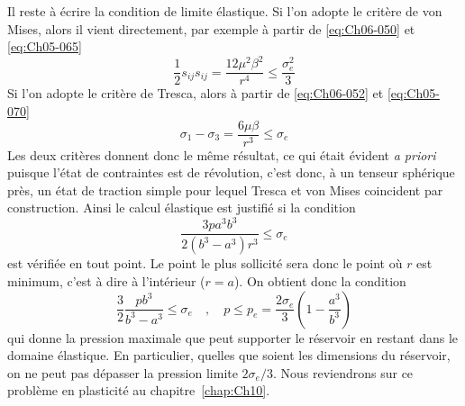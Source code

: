 Il reste à écrire la condition de limite élastique.
Si l'on adopte le critère de von Mises, alors il vient directement, par exemple à partir de \eqref{eq:Ch06-050} et \eqref{eq:Ch05-065}
\begin{equation}
    \frac{1}{2} s_{ij} s_{ij} = \frac{12 \mu^2 \beta^2}{r^4} \leq \frac{\sigma_e^2}{3}
    \label{eq:Ch06-055}
\end{equation}
Si l'on adopte le critère de Tresca, alors à partir de \eqref{eq:Ch06-052} et \eqref{eq:Ch05-070}
\begin{equation}
    \sigma_1 - \sigma_3 = \frac{6\mu\beta}{r^3} \leq \sigma_e
    \label{eq:Ch06-056}
\end{equation}
Les deux critères donnent donc le même résultat, ce qui était évident \textit{a priori} puisque l'état de contraintes est de révolution, c'est donc, à un tenseur sphérique près, un état de traction simple pour lequel Tresca et von Mises coincident par construction.
Ainsi le calcul élastique est justifié si la condition
\begin{equation}
    \frac{3pa^3b^3}{2\left( b^3 -a^3 \right)r^3} \leq \sigma_e
    \label{eq:Ch06-057}
\end{equation}
est vérifiée en tout point.
Le point le plus sollicité sera donc le point où $r$ est minimum, c'est à dire à l'intérieur ($r=a$).
On obtient donc la condition
\begin{equation}
    \frac{3}{2}\frac{pb^3}{b^3-a^3} \leq \sigma_e \quad , \quad p \leq p_e = \frac{2\sigma_e}{3} \left( 1 - \frac{a^3}{b^3} \right)
    \label{eq:Ch06-058}
\end{equation}
qui donne la pression maximale que peut supporter le réservoir en restant dans le domaine élastique.
En particulier, quelles que soient les dimensions du réservoir, on ne peut pas dépasser la pression limite $2\sigma_e/3$.
Nous reviendrons sur ce problème en plasticité au chapitre~\ref{chap:Ch10}.

